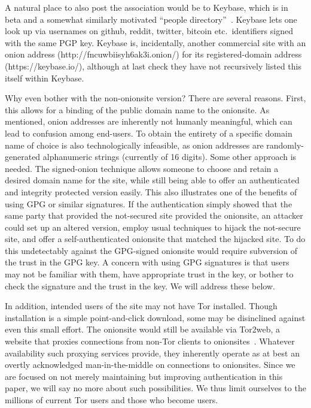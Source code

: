 \documentclass[10pt, conference, compsocconf]{styles/IEEEtran}
\begin{document}
A natural place to also post the association would be to Keybase,
which is in beta and a somewhat similarly motivated ``people
directory''~\cite{keybase}. Keybase lets one look up via usernames on
github, reddit, twitter, bitcoin etc.\ identifiers signed with the
same PGP key. Keybase is, incidentally, another commercial site with
an onion address (http://fncuwbiisyh6ak3i.onion/) for its
registered-domain address (https://keybase.io/), although at last
check they have not recursively listed this itself within Keybase.

Why even bother with the non-onionsite version? There are several
reasons. First, this allows for a binding of the public domain name to
the onionsite. As mentioned, onion addresses are inherently not
humanly meaningful, which can lead to confusion among end-users.  To
obtain the entirety of a specific domain name of choice is also
technologically infeasible, as onion addresses are randomly-generated
alphanumeric strings (currently of 16 digits). Some other approach is
needed. The signed-onion technique allows someone to choose and retain
a desired domain name for the site, while still being able to offer an
authenticated and integrity protected version easily. This also
illustrates one of the benefits of using GPG or similar signatures. If
the authentication simply showed that the same party that provided the
not-secured site provided the onionsite, an attacker could set up an
altered version, employ usual techniques to hijack the not-secure
site, and offer a self-authenticated onionsite that matched the
hijacked site.  To do this undetectably against the GPG-signed
onionsite would require subversion of the trust in the GPG key. A
concern with using GPG signatures is that users may not be familiar
with them, have appropriate trust in the key, or bother to check the
signature and the trust in the key. We will address these below.

In addition, intended users of the site may not have Tor
installed.  Though installation is a simple point-and-click download,
some may be disinclined against even this small effort. The onionsite
would still be available via Tor2web, a website that proxies
connections from non-Tor clients to onionsites~\cite{tor2web}.
Whatever availability such proxying services provide, they inherently
operate as at best an overtly acknowledged man-in-the-middle on
connections to onionsites.  Since we are focused on not merely
maintaining but improving
authentication in this paper, we will say no more about such
possibilities. We thus limit ourselves to the millions of
current Tor users and those who become users.
\end{document}
